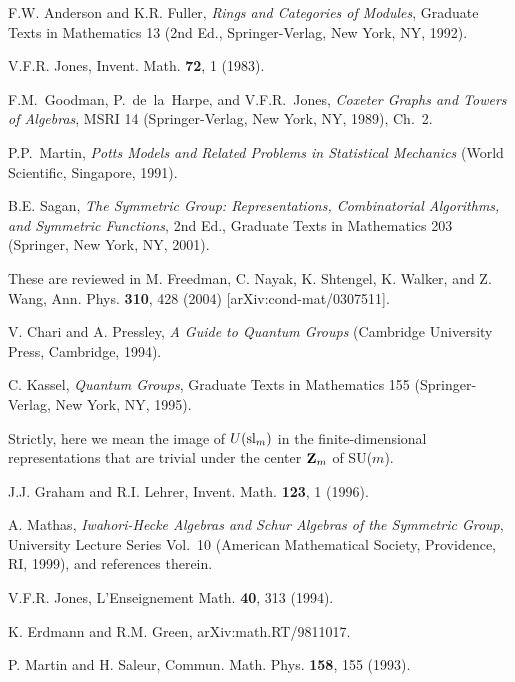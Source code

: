 \documentclass[twocolumn,floats,pra]{revtex4}
\begin{document}
\begin{references}
 F.W. Anderson and K.R. Fuller, {\it Rings and Categories
of Modules}, Graduate Texts in Mathematics 13 (2nd Ed.,
Springer-Verlag, New York, NY, 1992).

 V.F.R. Jones, Invent. Math. {\bf 72}, 1 (1983).

 F.M.~Goodman, P.~de~la~Harpe, and V.F.R.~Jones, {\it
Coxeter Graphs and Towers of Algebras}, MSRI 14 (Springer-Verlag,
New York, NY, 1989), Ch.\ 2.

 P.P.~Martin, {\it Potts Models and Related Problems
in Statistical Mechanics} (World Scientific, Singapore, 1991).

B.E. Sagan, {\it The Symmetric Group:
Representations, Combinatorial Algorithms, and Symmetric
Functions}, 2nd Ed., Graduate Texts in Mathematics 203 (Springer,
New York, NY, 2001).

 These are reviewed in M. Freedman, C. Nayak, K. Shtengel,
K. Walker, and Z. Wang, Ann. Phys. {\bf 310}, 428 (2004)
[arXiv:cond-mat/0307511].

 V. Chari and A. Pressley, {\it  A Guide to Quantum Groups}
(Cambridge University Press, Cambridge, 1994).

 C. Kassel, {\it Quantum Groups}, Graduate Texts in
Mathematics 155 (Springer-Verlag, New York, NY, 1995).

 Strictly, here we mean the image of $U({\rm
sl}_m)$ in the finite-dimensional representations that are trivial
under the center ${\bf Z}_m$ of SU($m$).



 J.J. Graham and R.I. Lehrer, Invent. Math. {\bf 123},
1 (1996).

 A. Mathas, {\it Iwahori-Hecke Algebras and Schur
Algebras of the Symmetric Group}, University Lecture Series Vol.\
10 (American Mathematical Society, Providence, RI, 1999), and
references therein.

 V.F.R. Jones, L'Enseignement Math. {\bf 40}, 313
(1994).

 K. Erdmann and R.M. Green, arXiv:math.RT/9811017.

 P. Martin and H. Saleur, Commun. Math. Phys. {\bf
158}, 155 (1993).


\end{references}
\end{document}
